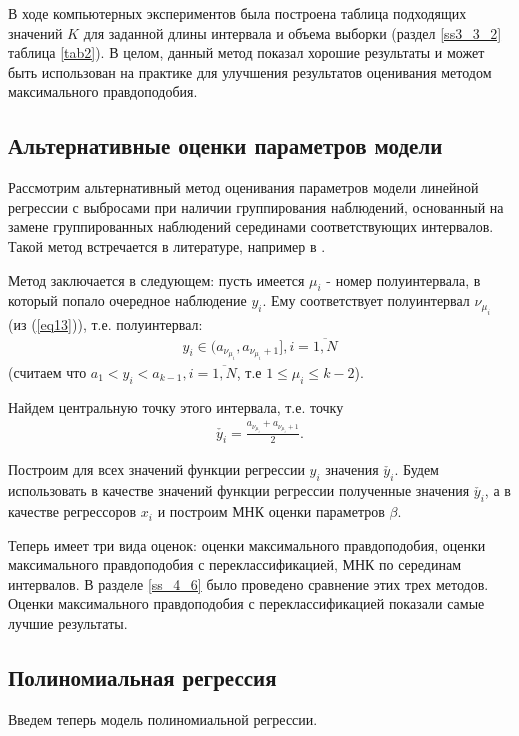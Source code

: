 В ходе компьютерных экспериментов была построена таблица подходящих значений $K$ для заданной длины интервала и объема выборки (раздел \ref{ss3_3_2} таблица \ref{tab2}).
В целом, данный метод показал хорошие результаты и может быть использован на практике для улучшения результатов оценивания методом максимального правдоподобия.

\subsection{Альтернативные оценки параметров модели}
Рассмотрим альтернативный метод оценивания параметров модели линейной регрессии с выбросами при наличии группирования наблюдений, основанный на замене группированных наблюдений серединами соответствующих интервалов. 
Такой метод встречается в литературе, например в \cite{interval_valued}.

Метод заключается в следующем:
пусть имеется $\mu_i$ - номер полуинтервала, в который попало очередное наблюдение $y_i$. Ему соответствует полуинтервал $\nu_{\mu_i}$ (из (\ref{eq13})), т.е. полуинтервал:
\begin{eqnarray}
    y_i\in (a_{\nu_{\mu_i}},a_{\nu_{\mu_i}+1}], i = \overline{1,N}
\end{eqnarray}
(считаем что $a_1<y_i<a_{k-1}, i=\overline{1,N}$, т.е $1\leq\mu_i\leq k-2$).

Найдем центральную точку этого интервала, т.е. точку
\begin{eqnarray}
    \check{y_i} = \frac{a_{\nu_{\mu_i}} + a_{\nu_{\mu_i}+1}}{2}.
\end{eqnarray}

Построим для всех значений функции регрессии $y_i$ значения $\check{y_i}$.
Будем использовать в качестве значений функции регрессии полученные значения $\check{y_i}$, а в качестве регрессоров $x_i$ и построим МНК оценки параметров $\beta$.

Теперь имеет три вида оценок: оценки максимального правдоподобия, оценки максимального правдоподобия с переклассификацией, МНК по серединам интервалов. 
В разделе \ref{ss_4_6} было проведено сравнение этих трех методов. 
Оценки максимального правдоподобия с переклассификацией показали самые лучшие результаты.
\subsection{Полиномиальная регрессия}
Введем теперь модель полиномиальной регрессии.

